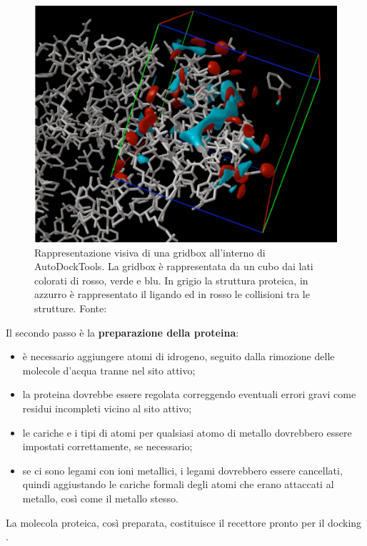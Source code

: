 \begin{figure}[H]
    \centering
    \includegraphics[scale=0.5]{images/chapter1/gridbox.jpg}
    \caption[Rappresentazione visiva di una gridbox in AutoDockTools]{Rappresentazione visiva di una gridbox all'interno di AutoDockTools. La gridbox è rappresentata da un cubo dai lati colorati di rosso, verde e blu. In grigio la struttura proteica, in azzurro è rappresentato il ligando ed in rosso le collisioni tra le strutture. Fonte: \cite{eberhardt_autodock_nodate}}
    \label{fig:gridbox}
\end{figure}

Il secondo passo è la \textbf{preparazione della proteina}: 
\begin{itemize}
    \item è necessario aggiungere atomi di idrogeno, seguito dalla rimozione delle molecole d'acqua tranne nel sito attivo;
    \item la proteina dovrebbe essere regolata correggendo eventuali errori gravi come residui incompleti vicino al sito attivo;
    \item le cariche e i tipi di atomi per qualsiasi atomo di metallo dovrebbero essere impostati correttamente, se necessario;
    \item se ci sono legami con ioni metallici, i legami dovrebbero essere cancellati, quindi aggiustando le cariche formali degli atomi che erano attaccati al metallo, così come il metallo stesso. 
\end{itemize}
La molecola proteica, così preparata, costituisce il recettore pronto per il docking \cite{roy_chapter_2015}.

